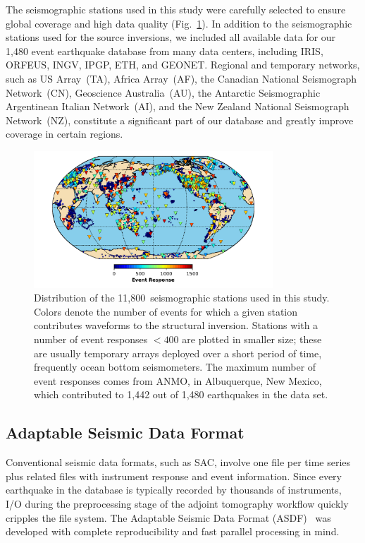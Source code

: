 The seismographic stations used in this study were carefully selected to ensure global coverage
and high data quality (Fig.~\ref{fig:stations}).
In addition to the seismographic  stations used for the source inversions,
we included all available data for our 1,480 event earthquake database from many data centers,
including IRIS, ORFEUS, INGV, IPGP, ETH, and GEONET.
Regional and temporary networks,
such as US Array~(TA),
Africa Array~(AF), the Canadian National Seismograph Network~(CN), Geoscience Australia~(AU),
the Antarctic Seismographic Argentinean Italian Network~(AI),
and the New Zealand National Seismograph Network~(NZ),
constitute a significant part
of our database and greatly improve coverage in certain regions.

\begin{figure}
  \includegraphics[width=0.8\textwidth]{ch-GLADM25/figures/station_map.pdf}
  \caption{\small{Distribution of the 11,800~seismographic stations used in this study. Colors denote the number of events for which a given station contributes waveforms to the structural inversion. Stations with a number of event responses $<400$ are plotted in smaller size; these are usually temporary arrays deployed over a short period of time, frequently ocean bottom seismometers. The maximum number of event responses comes from ANMO, in Albuquerque, New Mexico, which contributed to 1,442 out of 1,480 earthquakes in the data set.}}
  \label{fig:stations}
  \centering
\end{figure}

\subsection{Adaptable Seismic Data Format}
\label{section:ASDF}

Conventional seismic data formats, such as SAC, involve one file per time series
plus related files with instrument response and event information.
Since every earthquake in the database is typically recorded by thousands of
instruments, I/O during the preprocessing stage of the adjoint tomography workflow
quickly cripples the file system. The Adaptable Seismic Data Format
(ASDF)~\cite{krischer2016adaptable}
was developed with complete reproducibility and fast parallel processing in mind.

